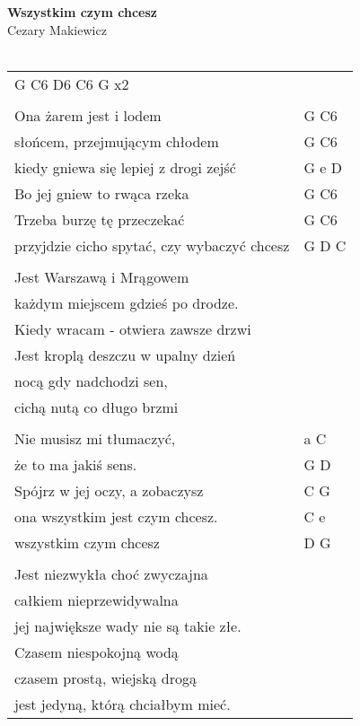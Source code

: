 \documentclass[a5paper]{article}
\begin{document}


\noindent
\fontsize{12pt}{15pt}\selectfont
\textbf{Wszystkim czym chcesz} \\
\fontsize{8pt}{10pt}\selectfont
Cezary Makiewicz \\ \\
\fontsize{10pt}{12pt}\selectfont
{}
\begin{tabular}{@{}p{8.00cm}p{3cm}@{}}
\noindent
G C6 D6 C6 G x2 \\ \\

Ona żarem jest i lodem & G C6 \\
słońcem, przejmującym chłodem & G C6 \\
kiedy gniewa się lepiej z drogi zejść & G e D \\
Bo jej gniew to rwąca rzeka & G C6 \\
Trzeba burzę tę przeczekać & G C6 \\
przyjdzie cicho spytać, czy wybaczyć chcesz & G D C \\ \\

Jest Warszawą i Mrągowem \\
każdym miejscem gdzieś po drodze.\\
Kiedy wracam - otwiera zawsze drzwi\\
Jest kroplą deszczu w upalny dzień \\
nocą gdy nadchodzi sen,\\
cichą nutą co długo brzmi\\\\

Nie musisz mi tłumaczyć, & a C \\
że to ma jakiś sens. & G D \\
Spójrz w jej oczy, a zobaczysz & C G \\
ona wszystkim jest czym chcesz. & C e \\
wszystkim czym chcesz & D G \\ \\

Jest niezwykła choć zwyczajna \\
całkiem nieprzewidywalna\\
jej największe wady nie są takie złe.\\
Czasem niespokojną wodą \\
czasem prostą, wiejską drogą \\
jest jedyną, którą chciałbym mieć.
\end{tabular}
\end{document}
